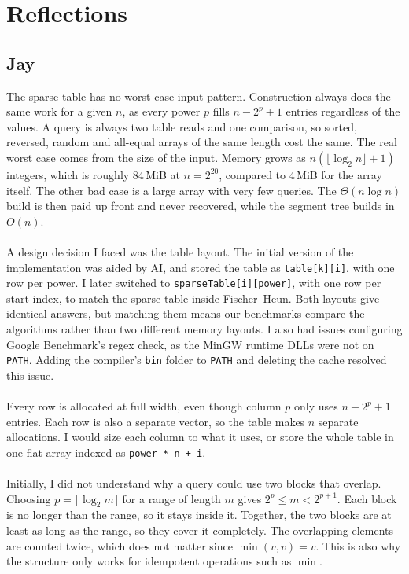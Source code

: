 \documentclass{article}
\theoremstyle{definition}
\begin{document}
\section{Reflections}
\subsection{Jay}
The sparse table has no worst-case input pattern. Construction always does the same work for a given $n$, as every power $p$ fills $n - 2^{p} + 1$ entries regardless of the values. A query is always two table reads and one comparison, so sorted, reversed, random and all-equal arrays of the same length cost the same. The real worst case comes from the size of the input. Memory grows as $n(\lfloor \log_2 n \rfloor + 1)$ integers, which is roughly 84\,MiB at $n = 2^{20}$, compared to 4\,MiB for the array itself. The other bad case is a large array with very few queries. The $\Theta(n \log n)$ build is then paid up front and never recovered, while the segment tree builds in $O(n)$.
\\
\\
A design decision I faced was the table layout. The initial version of the implementation was aided by AI, and stored the table as \texttt{table[k][i]}, with one row per power. I later switched to \texttt{sparseTable[i][power]}, with one row per start index, to match the sparse table inside Fischer--Heun. Both layouts give identical answers, but matching them means our benchmarks compare the algorithms rather than two different memory layouts. I also had issues configuring Google Benchmark's regex check, as the MinGW runtime DLLs were not on \texttt{PATH}. Adding the compiler's \texttt{bin} folder to \texttt{PATH} and deleting the cache resolved this issue.
\\
\\
Every row is allocated at full width, even though column $p$ only uses $n - 2^{p} + 1$ entries. Each row is also a separate vector, so the table makes $n$ separate allocations. I would size each column to what it uses, or store the whole table in one flat array indexed as \texttt{power * n + i}.
\\
\\
Initially, I did not understand why a query could use two blocks that overlap. Choosing $p = \lfloor \log_2 m \rfloor$ for a range of length $m$ gives $2^{p} \le m < 2^{p+1}$. Each block is no longer than the range, so it stays inside it. Together, the two blocks are at least as long as the range, so they cover it completely. The overlapping elements are counted twice, which does not matter since $\min(v, v) = v$. This is also why the structure only works for idempotent operations such as $\min$.
\end{document}
